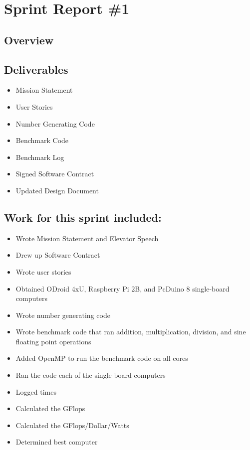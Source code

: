 
\section{Sprint Report \#1}

\subsection*{Overview}

\subsection*{Deliverables}
\begin{itemize}
	\item Mission Statement
	\item User Stories
	\item Number Generating Code
	\item Benchmark Code
	\item Benchmark Log
	\item Signed Software Contract
	\item Updated Design Document
\end{itemize}

\subsection*{Work for this sprint included:}
\begin{itemize}
	\item Wrote Mission Statement and Elevator Speech
	\item Drew up Software Contract
	\item Wrote user stories
	\item Obtained ODroid 4xU, Raspberry Pi 2B, and PcDuino 8 single-board computers
	\item Wrote number generating code
	\item Wrote benchmark code that ran addition, multiplication, division, and sine floating point operations
	\item Added OpenMP to run the benchmark code on all cores
	\item Ran the code each of the single-board computers
	\item Logged times
	\item Calculated the GFlops
	\item Calculated the GFlops/Dollar/Watts
	\item Determined best computer
\end{itemize}

